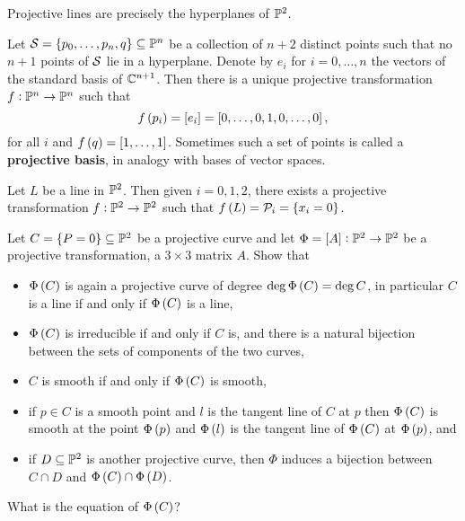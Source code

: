 \begin{example}
Projective lines are precisely the hyperplanes of $ \mathbb{P}^2 $.
\end{example}

\begin{exercise**}
Let $ \SSS = \cbr{p_0, \dots, p_n, q} \subseteq \PP^n $ be a collection of $ n + 2 $ distinct points such that no $ n + 1 $ points of $ \mathcal{S} $ lie in a hyperplane. Denote by $ e_i $ for $ i = 0, \dots, n $ the vectors of the standard basis of $ \mathbb{C}^{n + 1} $. Then there is a unique projective transformation $ f : \mathbb{P}^n \to \mathbb{P}^n $ such that
$$ f\br{p_i} = \sbr{e_i} = \sbr{0, \dots, 0, 1, 0, \dots, 0}, $$
for all $ i $ and $ f\br{q} = \sbr{1, \dots, 1} $. Sometimes such a set of points is called a \textbf{projective basis}, in analogy with bases of vector spaces.
\end{exercise**}

\begin{exercise**}
Let $ L $ be a line in $ \mathbb{P}^2 $. Then given $ i = 0, 1, 2 $, there exists a projective transformation $ f : \mathbb{P}^2 \to \mathbb{P}^2 $ such that $ f\br{L} = \PPP_i = \cbr{x_i = 0} $.
\end{exercise**}

\begin{exercise**}
\label{ex:29}
Let $ C = \cbr{P = 0} \subseteq \PP^2 $ be a projective curve and let $ \Phi = \sbr{A} : \PP^2 \to \PP^2 $ be a projective transformation, a $ 3 \times 3 $ matrix $ A $. Show that
\begin{itemize}
\item $ \Phi\br{C} $ is again a projective curve of degree $ \deg \Phi\br{C} = \deg C $, in particular $ C $ is a line if and only if $ \Phi\br{C} $ is a line,
\item $ \Phi\br{C} $ is irreducible if and only if $ C $ is, and there is a natural bijection between the sets of components of the two curves,
\item $ C $ is smooth if and only if $ \Phi\br{C} $ is smooth,
\item if $ p \in C $ is a smooth point and $ l $ is the tangent line of $ C $ at $ p $ then $ \Phi\br{C} $ is smooth at the point $ \Phi\br{p} $ and $ \Phi\br{l} $ is the tangent line of $ \Phi\br{C} $ at $ \Phi\br{p} $, and
\item if $ D \subseteq \mathbb{P}^2 $ is another projective curve, then $ \Phi $ induces a bijection between $ C \cap D $ and $ \Phi\br{C} \cap \Phi\br{D} $.
\end{itemize}
What is the equation of $ \Phi\br{C} $?
\end{exercise**}

